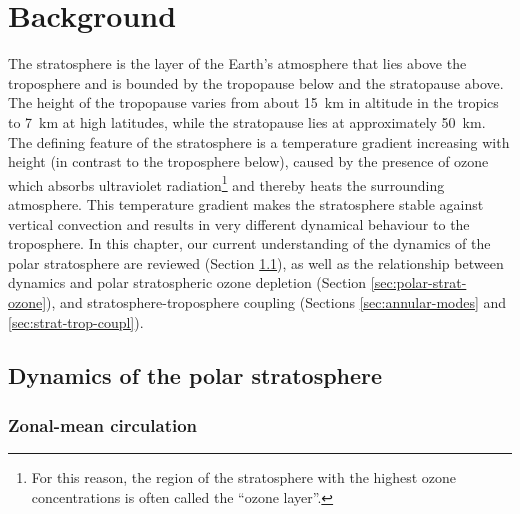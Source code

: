 \chapter{Background}
\label{cha:background}


The stratosphere is the layer of the Earth's atmosphere that lies above the
troposphere and is bounded by the tropopause below and the stratopause
above. The height of the tropopause varies from about 15~km in altitude in the
tropics to 7~km at high latitudes, while the stratopause lies at approximately
50~km. The defining feature of the stratosphere is a temperature gradient
increasing with height (in contrast to the troposphere below), caused by the
presence of ozone which absorbs ultraviolet radiation\footnote{For this reason,
  the region of the stratosphere with the highest ozone concentrations is often
  called the ``ozone layer''.}  and thereby heats the surrounding
atmosphere. This temperature gradient makes the stratosphere stable against
vertical convection and results in very different dynamical behaviour to the
troposphere. In this chapter, our current understanding of the dynamics of the
polar stratosphere are reviewed (Section \ref{sec:dynam-polar-strat}), as well
as the relationship between dynamics and polar stratospheric ozone depletion
(Section \ref{sec:polar-strat-ozone}), and stratosphere-troposphere coupling
(Sections \ref{sec:annular-modes} and \ref{sec:strat-trop-coupl}).

\section{Dynamics of the polar stratosphere}
\label{sec:dynam-polar-strat}


\subsection{Zonal-mean circulation}

